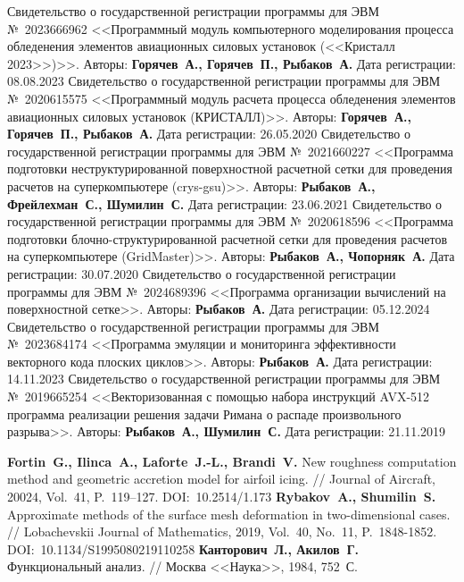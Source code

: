 \begin{thebibliography}{99}
Свидетельство о государственной регистрации программы для ЭВМ №~2023666962 <<Программный модуль компьютерного моделирования процесса обледенения элементов авиационных силовых установок (<<Кристалл 2023>>)>>. Авторы: \textbf{Горячев~А., Горячев~П., Рыбаков~А.} Дата регистрации: 08.08.2023
Свидетельство о государственной регистрации программы для ЭВМ №~2020615575 <<Программный модуль расчета процесса обледенения элементов авиационных силовых установок (КРИСТАЛЛ)>>. Авторы: \textbf{Горячев~А., Горячев~П., Рыбаков~А.} Дата регистрации: 26.05.2020
Свидетельство о государственной регистрации программы для ЭВМ №~2021660227 <<Программа подготовки неструктурированной поверхностной расчетной сетки для проведения расчетов на суперкомпьютере (crys-gsu)>>. Авторы: \textbf{Рыбаков~А., Фрейлехман~С., Шумилин~С.} Дата регистрации: 23.06.2021
Свидетельство о государственной регистрации программы для ЭВМ №~2020618596 <<Программа подготовки блочно-структурированной расчетной сетки для проведения расчетов на суперкомпьютере (GridMaster)>>. Авторы: \textbf{Рыбаков~А., Чопорняк~А.} Дата регистрации: 30.07.2020
Свидетельство о государственной регистрации программы для ЭВМ №~2024689396 <<Программа организации вычислений на поверхностной сетке>>. Авторы: \textbf{Рыбаков~А.} Дата регистрации: 05.12.2024
Свидетельство о государственной регистрации программы для ЭВМ №~2023684174 <<Программа эмуляции и мониторинга эффективности векторного кода плоских циклов>>. Авторы: \textbf{Рыбаков~А.} Дата регистрации: 14.11.2023
Свидетельство о государственной регистрации программы для ЭВМ №~2019665254 <<Векторизованная с помощью набора инструкций AVX-512 программа реализации решения задачи Римана о распаде произвольного разрыва>>. Авторы: \textbf{Рыбаков~А., Шумилин~С.} Дата регистрации: 21.11.2019


\textbf{Fortin~G., Ilinca~A., Laforte~J.-L., Brandi~V.} New roughness computation method and geometric accretion model for airfoil icing. // Journal of Aircraft, 20024, Vol.~41, P.~119–127. DOI:~10.2514/1.173
\textbf{Rybakov~A., Shumilin~S.} Approximate methods of the surface mesh deformation in two-dimensional cases. // Lobachevskii Journal of Mathematics, 2019, Vol.~40, No.~11, P.~1848-1852. DOI:~10.1134/S1995080219110258
\textbf{Канторович~Л., Акилов~Г.} Функциональный анализ. // Москва <<Наука>>, 1984, 752~С.


\end{thebibliography}
